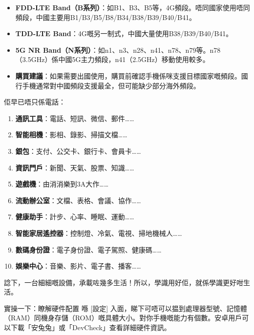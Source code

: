 \begin{itemize}
  \item \textbf{FDD-LTE Band（B系列）}：如B1、B3、B5等，4G頻段。唔同國家使用唔同頻段，中國主要用B1/B3/B5/B8/B34/B38/B39/B40/B41。
  \item \textbf{TDD-LTE Band}：4G嘅另一制式，中國大量使用B38/B39/B40/B41。
  \item \textbf{5G NR Band（N系列）}：如n1、n3、n28、n41、n78、n79等。n78（3.5GHz）係中國5G主力頻段，n41（2.5GHz）移動使用較多。
  \item \textbf{購買建議}：如果需要出國使用，購買前確認手機係咪支援目標國家嘅頻段。國行手機通常對中國頻段支援最全，但可能缺少部分海外頻段。
\end{itemize}


佢早已唔只係電話：

\begin{enumerate}
  \item \textbf{通訊工具}：電話、短訊、微信、郵件……
  \item \textbf{智能相機}：影相、錄影、掃描文檔……
  \item \textbf{銀包}：支付、公交卡、銀行卡、會員卡……
  \item \textbf{資訊門戶}：新聞、天氣、股票、知識……
  \item \textbf{遊戲機}：由消消樂到3A大作……
  \item \textbf{流動辦公室}：文檔、表格、會議、協作……
  \item \textbf{健康助手}：計步、心率、睡眠、運動……
  \item \textbf{智能家居遙控器}：控制燈、冷氣、電視、掃地機械人……
  \item \textbf{數碼身份證}：電子身份證、電子駕照、健康碼……
  \item \textbf{娛樂中心}：音樂、影片、電子書、播客……
\end{enumerate}

諗下，一台細細嘅設備，承載咗幾多生活！所以，學識用好佢，就係學識更好咁生活。

\begin{tcbpractice}{實操一下：瞭解硬件配置}
喺 [設定] 入面，睇下可唔可以揾到處理器型號、記憶體（RAM）同機身存儲（ROM）嘅具體大小。對你手機嘅能力有個數。安卓用戶可以下載「安兔兔」或「DevCheck」查看詳細硬件資訊。

\end{tcbpractice}

